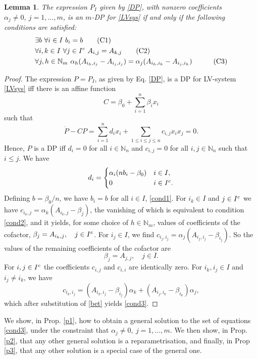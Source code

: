 \documentclass{article}
\newcounter{NN}
\newtheorem{lemma}[NN]{Lemma}
\def\N{\mathbb{N}}
\begin{document}
\begin{lemma} \label{lem}
The expression $P_I$ given by \eqref{DP}, with nonzero coefficients $\alpha_j\neq 0,\ j=1,\ldots,m$, is an $m$-DP for \eqref{LVsys} if and only if the following conditions are satisfied:
\begin{align}
&\exists b\ \forall i\in I\ b_{i} = b \tag{C1} \label{cond1}\\
&\forall i,k\in I\ \forall j \in I^{\rm c}\ A_{i,j} = A_{k,j} \tag{C2} \label{cond2}\\
&\forall j,h\in \N_m\ \alpha_h (A_{i_h,i_j}-A_{i_j,i_j}) = \alpha_j (A_{i_h,i_h}-A_{i_j,i_h}) \quad \tag{C3} \label{cond3}
\end{align}
\end{lemma}
\begin{proof}
The expression $P = P_I$, as given by Eq. \eqref{DP}, is a DP for LV-system \eqref{LVsys} iff there is an affine function
\[
C=\beta_0+\sum_{i=1}^n\beta_i x_i
\]
such that
\[
\dot{P}-CP=\sum_{i=1}^n d_ix_i +\sum_{1\leq i\leq j\leq n} c_{i,j} x_ix_j=0.
\]
Hence, $P$ is a  DP iff $d_i=0$ for all $i\in \N_n$ and $c_{i,j}=0$ for all $i,j \in \N_n$ such that $i\leq j$. We have
\[
d_i=
\begin{cases}
\alpha_i(nb_i-\beta_0)  & i\in I,\\
0                       & i\in I^{\rm c}.
\end{cases}
\]
Defining $b=\beta_0/n$, we have $b_i=b$ for all $i\in I$, \eqref{cond1}. For $i_k\in I$ and $j\in I^{\rm c}$ we have
$c_{i_k,j}=\alpha_k(A_{i_k,j}-\beta_j)$, the vanishing of which is equivalent to condition \eqref{cond2}, and it yields, for some choice of $h\in\N_m$, values of coefficients of the cofactor, $\beta_j=A_{i_h,j},\quad j\in I^{\rm c}$.
For $i_j\in I$, we find $c_{i_j,i_j}=\alpha_j(A_{i_j,i_j}-\beta_{i_j})$. So the values of the remaining coefficients of the cofactor are
\begin{equation} \label{bet}
\beta_j=A_{j,j},\quad j\in I.
\end{equation}
For $i,j\in I^{\rm c}$ the coefficients $c_{i,j}$ and $c_{i,i}$ are identically zero. For $i_k,i_j\in I$ and $i_j\neq i_k$, we have
\begin{equation} \label{cij}
c_{i_k,i_j}=(A_{i_k,i_j}-\beta_{i_j})\alpha_k+(A_{i_j,i_k}-\beta_{i_k})\alpha_j,
\end{equation}
which after substitution of \eqref{bet} yields \eqref{cond3}.
\end{proof}

We show, in Prop. \ref{p1}, how to obtain a general solution to the set of
equations \eqref{cond3}, under the constraint that $\alpha_j\neq 0,\ j=1,\ldots,m$.
We then show, in Prop. \ref{p2}, that any other general solution is a reparametrisation, and finally, in Prop \ref{p3}, that any other solution is a special case of the general one.
\end{document}
